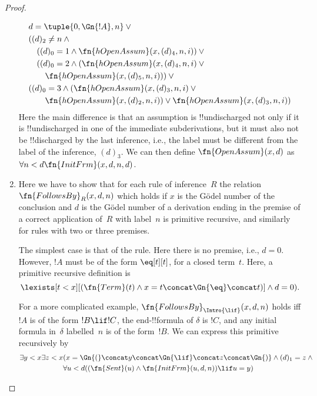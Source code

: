 \documentclass[../../include/open-logic-section]{subfiles}
\begin{document}
\begin{proof}
\begin{enumerate}
\begin{multline*}
    \begin{aligned}
&  d = \tuple{0, \Gn{!A}, n} \lor {}\\
      &  ((d)_2 \neq n \land {}\\
      & \quad((d)_0 = 1 \land \fn{hOpenAssum}(x, (d)_4, n, i)) \lor {}\\
      & \quad((d)_0 = 2 \land (\fn{hOpenAssum}(x, (d)_4, n, i) \lor {}\\
      & \qquad\fn{hOpenAssum}(x, (d)_5, n, i))) \lor {}\\
      & ((d)_0 = 3 \land (\fn{hOpenAssum}(x, (d)_3, n, i) \lor {}\\
      & \qquad \fn{hOpenAssum}(x, (d)_2, n, i)) \lor
      \fn{hOpenAssum}(x, (d)_3, n, i))
\end{aligned}
  \end{multline*}
  Here the main difference is that an assumption is !!{undischarged}
  not only if it is !!{undischarged} in one of the immediate
  subderivations, but it must also not be !!{discharged} by the last
  inference, i.e., the label must be different from the label of the
  inference, $(d)_3$.  We can then define $\fn{OpenAssum}(x, d)$ as
  $\forall n<d \fn{InitFrm}(x,d,n,d)$.
\item Here we have to show that for each rule of inference~$R$ the
  relation $\fn{FollowsBy}_R(x, d, n)$ which holds if $x$ is the
  G\"odel number of the conclusion and $d$ is the G\"odel number of a
  derivation ending in the premise of a correct application of~$R$
  with label~$n$ is primitive recursive, and similarly for rules with
  two or three premises.

  The simplest case is that of the \Intro{\eq} rule. Here there is no
  premise, i.e., $d = 0$.  However, $!A$ must be of the form
  $\eq[t][t]$, for a closed term~$t$. Here, a primitive recursive
  definition is
  \[\lexists[t<x][(\fn{Term}(t) \land x = t\concat
    \Gn{\eq} \concat t)] \land d = 0).\]

  For a more complicated example, $\fn{FollowsBy}_{\Intro{\lif}}(x, d,
    n)$ holds iff $!A$ is of the form $!B \lif !C$, the
  end-!!{formula} of $\delta$ is $!C$, and any initial formula
  in~$\delta$ labelled~$n$ is of the form~$!B$.  We can express this
  primitive recursively by
  \begin{align*}
  \exists y<x\exists z<x &(x = \Gn{(} \concat y \concat \Gn{\lif}
  \concat z\concat \Gn{)} \land (d)_1 = z \land {}\\
&  \forall
  u<d((\fn{Sent}(u) \land \fn{InitFrm}(u, d, n)) \lif u = y)
  \end{align*}


\end{enumerate}
\end{proof}
\end{document}
